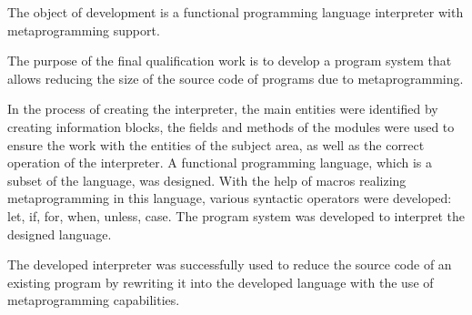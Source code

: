 The object of development is a functional programming language interpreter with metaprogramming support.

The purpose of the final qualification work is to develop a program system that allows reducing the size of the source code of programs due to metaprogramming.

In the process of creating the interpreter, the main entities were identified by creating information blocks, the fields and methods of the modules were used to ensure the work with the entities of the subject area, as well as the correct operation of the interpreter. A functional programming language, which is a subset of the  language, was designed. With the help of macros realizing metaprogramming in this language, various syntactic operators were developed: let, if, for, when, unless, case. The program system was developed to interpret the designed language.

The developed interpreter was successfully used to reduce the source code of an existing program by rewriting it into the developed language with the use of metaprogramming capabilities.
